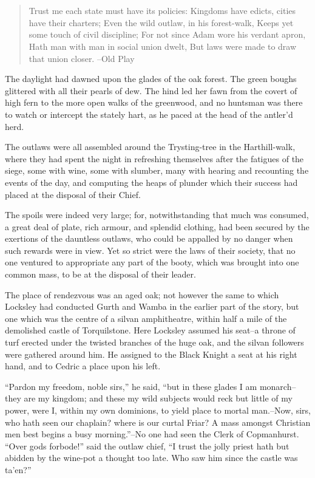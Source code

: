 \chapter{}

\begin{quote}
Trust me each state must have its policies:
Kingdoms have edicts, cities have their charters;
Even the wild outlaw, in his forest-walk,
Keeps yet some touch of civil discipline;
For not since Adam wore his verdant apron,
Hath man with man in social union dwelt,
But laws were made to draw that union closer.
--Old Play
\end{quote}

The daylight had dawned upon the glades of the oak forest. The green
boughs glittered with all their pearls of dew. The hind led her fawn
from the covert of high fern to the more open walks of the greenwood,
and no huntsman was there to watch or intercept the stately hart, as he
paced at the head of the antler'd herd.

The outlaws were all assembled around the Trysting-tree in the
Harthill-walk, where they had spent the night in refreshing themselves
after the fatigues of the siege, some with wine, some with slumber, many
with hearing and recounting the events of the day, and computing the
heaps of plunder which their success had placed at the disposal of their
Chief.

The spoils were indeed very large; for, notwithstanding that much was
consumed, a great deal of plate, rich armour, and splendid clothing, had
been secured by the exertions of the dauntless outlaws, who could be
appalled by no danger when such rewards were in view. Yet so strict were
the laws of their society, that no one ventured to appropriate any part
of the booty, which was brought into one common mass, to be at the
disposal of their leader.

The place of rendezvous was an aged oak; not however the same to which
Locksley had conducted Gurth and Wamba in the earlier part of the story,
but one which was the centre of a silvan amphitheatre, within half a
mile of the demolished castle of Torquilstone. Here Locksley assumed his
seat--a throne of turf erected under the twisted branches of the huge
oak, and the silvan followers were gathered around him. He assigned to
the Black Knight a seat at his right hand, and to Cedric a place upon
his left.

``Pardon my freedom, noble sirs,'' he said, ``but in these glades I am
monarch--they are my kingdom; and these my wild subjects would reck but
little of my power, were I, within my own dominions, to yield place to
mortal man.--Now, sirs, who hath seen our chaplain? where is our curtal
Friar? A mass amongst Christian men best begins a busy morning.''--No
one had seen the Clerk of Copmanhurst. ``Over gods forbode!'' said the
outlaw chief, ``I trust the jolly priest hath but abidden by the
wine-pot a thought too late. Who saw him since the castle was ta'en?''

